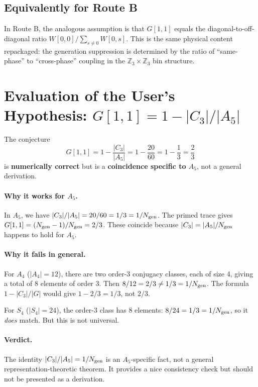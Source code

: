 \documentclass[11pt]{article}
\theoremstyle{definition}
\begin{document}
\subsection{Equivalently for Route B}

In Route B, the analogous assumption is that $G[1,1]$ equals the diagonal-to-off-diagonal
ratio $W[0,0]/\sum_{s \neq 0} W[0,s]$. This is the same physical content repackaged:
the generation suppression is determined by the ratio of ``same-phase'' to ``cross-phase''
coupling in the $\mathbb{Z}_3 \times \mathbb{Z}_3$ bin structure.

\section{Evaluation of the User's Hypothesis: $G[1,1] = 1 - |C_3|/|A_5|$}

The conjecture
\begin{equation}
G[1,1] = 1 - \frac{|C_3|}{|A_5|} = 1 - \frac{20}{60} = 1 - \frac{1}{3} = \frac{2}{3}
\end{equation}
is \textbf{numerically correct} but is a \textbf{coincidence specific to $A_5$}, not a general derivation.

\paragraph{Why it works for $A_5$.}
In $A_5$, we have $|C_3|/|A_5| = 20/60 = 1/3 = 1/N_{\rm gen}$.
The primed trace gives $G[1,1] = (N_{\rm gen}-1)/N_{\rm gen} = 2/3$.
These coincide because $|C_3| = |A_5|/N_{\rm gen}$ happens to hold for $A_5$.

\paragraph{Why it fails in general.}
For $A_4$ ($|A_4| = 12$), there are two order-3 conjugacy classes, each of size 4,
giving a total of 8 elements of order 3. Then $8/12 = 2/3 \neq 1/3 = 1/N_{\rm gen}$.
The formula $1 - |C_3|/|G|$ would give $1 - 2/3 = 1/3$, not $2/3$.

For $S_4$ ($|S_4| = 24$), the order-3 class has 8 elements: $8/24 = 1/3 = 1/N_{\rm gen}$,
so it \emph{does} match. But this is not universal.

\paragraph{Verdict.}
The identity $|C_3|/|A_5| = 1/N_{\rm gen}$ is an $A_5$-specific fact, not a general
representation-theoretic theorem. It provides a nice consistency check but should
not be presented as a derivation.
\end{document}
